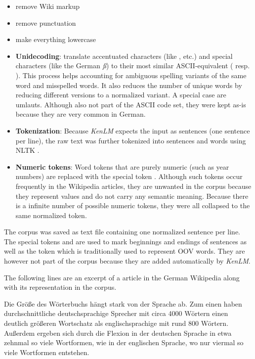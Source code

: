 \begin{itemize}
	\item remove Wiki markup
	\item remove punctuation
	\item make everything lowercase
	\item \textbf{Unidecoding}: translate accentuated characters (like , etc.) and special characters (like the German \textit{ß}) to their most similar ASCII-equivalent ( resp. ). This process helps accounting for ambiguous spelling variants of the same word and misspelled words. It also reduces the number of unique words by reducing different versions to a normalized variant. A special case are umlauts. Although also not part of the ASCII code set, they were kept as-is because they are very common in German.
	\item \textbf{Tokenization}: Because \textit{KenLM} expects the input as sentences (one sentence per line), the raw text was further tokenized into sentences and words using NLTK \parencite{nltk}. 
	\item \textbf{Numeric tokens}: Word tokens that are purely numeric (such as year numbers) are replaced with the special token . Although such tokens occur frequently in the Wikipedia articles, they are unwanted in the corpus because they represent values and do not carry any semantic meaning. Because there is a infinite number of possible numeric tokens, they were all collapsed to the same normalized token.
\end{itemize}

The corpus was saved as text file containing one normalized sentence per line. The special tokens  and  are used to mark beginnings and endings of sentences as well as the  token which is traditionally used to represent \ac{OOV} words. They are however not part of the corpus because they are added automatically by \textit{KenLM}.

The following lines are an excerpt of a article in the German Wikipedia along with its representation in the corpus.

\begin{displayquote}
	Die Größe des Wörterbuchs hängt stark von der Sprache ab. Zum einen haben durchschnittliche deutschsprachige Sprecher mit circa 4000 Wörtern einen deutlich größeren Wortschatz als englischsprachige mit rund 800 Wörtern. Außerdem ergeben sich durch die Flexion in der deutschen Sprache in etwa zehnmal so viele Wortformen, wie in der englischen Sprache, wo nur viermal so viele Wortformen entstehen.
\end{displayquote}

